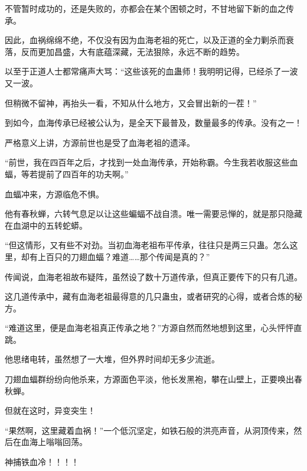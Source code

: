 \begin{this_body}
不管暂时成功的，还是失败的，亦都会在某个困顿之时，不甘地留下新的血之传承。

因此，血祸绵绵不绝，不仅没有因为血海老祖的死亡，以及正道的全力剿杀而衰落，反而更加昌盛，大有底蕴深藏，无法狠除，永远不断的趋势。

以至于正道人士都常痛声大骂：“这些该死的血蛊师！我明明记得，已经杀了一波又一波。

但稍微不留神，再抬头一看，不知从什么地方，又会冒出新的一茬！”

到如今，血海传承已经被公认为，是全天下最普及，数量最多的传承。没有之一！

严格意义上讲，方源前世也是受了血海老祖的遗泽。

“前世，我在四百年之后，才找到一处血海传承，开始称霸。今生我若收服这些血蝠，等若提前了四百年的功夫啊。”

血蝠冲来，方源临危不惧。

他有春秋蝉，六转气息足以让这些蝙蝠不战自溃。唯一需要忌惮的，就是那只隐藏在血湖中的五转蛇蟒。

“但这情形，又有些不对劲。当初血海老祖布平传承，往往只是两三只蛊。怎么这里，却有上百只的刀翅血蝠？难道……那个传闻是真的？”

传闻说，血海老祖故布疑阵，虽然设了数十万道传承，但真正要传下的只有几道。

这几道传承中，藏有血海老祖最得意的几只蛊虫，或者研究的心得，或者合炼的秘方。

“难道这里，便是血海老祖真正传承之地？”方源自然而然地想到这里，心头怦怦直跳。

他思绪电转，虽然想了一大堆，但外界时间却无多少流逝。

刀翅血蝠群纷纷向他杀来，方源面色平淡，他长发黑袍，攀在山壁上，正要唤出春秋蝉。

但就在这时，异变突生！

“果然啊，这里藏着血祸！”一个低沉坚定，如铁石般的洪亮声音，从洞顶传来，然后在血海上嗡嗡回荡。

神捕铁血冷！！！！

\end{this_body}

